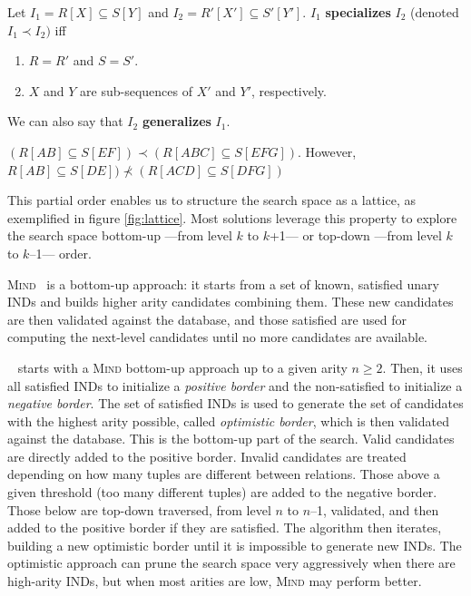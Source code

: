 \begin{definition}
    \label{def:specialization}
    Let $I_1 = R[X] \subseteq S[Y]$ and
    $I_2 = R'[X'] \subseteq S'[Y']$. $I_1$ \textbf{specializes} $I_2$ (denoted $I_1 \prec I_2)$ iff
    
    \begin{enumerate}
        \item $R = R'$ and $S = S'$.
        \item $X$ and $Y$ are sub-sequences of $X'$ and $Y'$, respectively.
    \end{enumerate}
    
    We can also say that $I_2$ \textbf{generalizes} $I_1$.
\end{definition}

\begin{example}
$(R[AB] \subseteq S[EF]) \prec (R[ABC] \subseteq S[EFG])$. However,
$R[AB] \subseteq S[DE]) \nprec (R[ACD] \subseteq S[DFG])$
\end{example}

This partial order enables us to structure the search space as a lattice, as exemplified in figure
\ref{fig:lattice}. Most solutions leverage this property to explore the search space bottom-up
---from level $k$ to $k$+1--- or top-down ---from level $k$ to $k$--1--- order.

\textsc{Mind}~\cite{DeMarchi2002} is a bottom-up approach: it starts
from a set of known, satisfied unary \glspl{IND} and builds higher arity candidates
combining them.
These new candidates are then validated against the database, and those satisfied
are used for computing the next-level candidates until no more candidates are available.

\Zigzag~\cite{DeMarchi2003zigzag} starts with a \textsc{Mind} bottom-up approach
up to a given arity $n \ge 2$. Then, it uses all satisfied \glspl{IND} to initialize a \textit{positive border}
and the non-satisfied to initialize a \textit{negative border}. The set of satisfied \glspl{IND}
is used to generate the set of candidates with the highest arity possible, called
\textit{optimistic border},
which is then validated against the database. This is the bottom-up part of the search.
Valid candidates are directly added to the positive border.
Invalid candidates are treated depending on how many tuples are different between relations.
Those above a given threshold (too many different tuples) are added to the negative border.
Those below are top-down traversed, from level $n$ to $n$--1, validated, and then added
to the positive border if they are satisfied. The algorithm then iterates, building a new
optimistic border until it is impossible to generate new \glspl{IND}. The optimistic approach
can prune the search space very aggressively when there are high-arity \glspl{IND},
but when most arities are low,  \textsc{Mind} may perform better.

